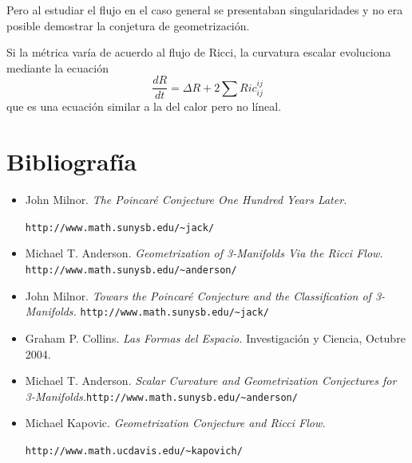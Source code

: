 \documentclass[a4paper, 12pt]{article}
\begin{document}
Pero al estudiar el flujo en el caso general se presentaban singularidades y no era posible demostrar la conjetura de geometrización.

 Si la métrica varía de acuerdo al flujo de Ricci, la curvatura escalar evoluciona mediante la ecuación
$$
\frac{d R}{dt}= \Delta R + 2 \sum {Ric}^{ij}_{ij}
$$
que es una ecuación similar a la del calor pero no líneal. 

\newpage

\section*{Bibliografía}



\begin{itemize}\small

\item John Milnor. {\it The Poincaré Conjecture One Hundred Years Later.}

 \verb|http://www.math.sunysb.edu/~jack/|

\item Michael T. Anderson. {\it Geometrization of 3-Manifolds Via the Ricci Flow.} \verb|http://www.math.sunysb.edu/~anderson/|


\item John Milnor. {\it Towars the Poincaré Conjecture and the Classification of \mbox{3-Manifolds.}} \verb|http://www.math.sunysb.edu/~jack/|

\item Graham P. Collins. {\it Las Formas del Espacio.} Investigación y Ciencia, Octubre 2004.

\item Michael T. Anderson. {\it Scalar Curvature and Geometrization Conjectures for 3-Manifolds.}\verb|http://www.math.sunysb.edu/~anderson/|

\item Michael Kapovic. {\it Geometrization Conjecture and Ricci Flow.}

 \verb|http://www.math.ucdavis.edu/~kapovich/|



\end{itemize}
\end{document}
